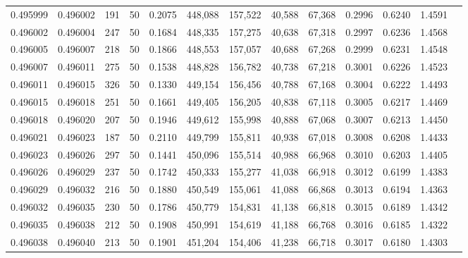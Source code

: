 \begin{tabular}{rrrrrrrrrrrrr}
0.495999 & 0.496002 &   191 &  50 &                                     0.2075 & 448,088 & 157,522 &  40,588 &  67,368 & 0.2996 & 0.6240 & 1.4591 \\
0.496002 & 0.496004 &   247 &  50 &                                     0.1684 & 448,335 & 157,275 &  40,638 &  67,318 & 0.2997 & 0.6236 & 1.4568 \\
0.496005 & 0.496007 &   218 &  50 &                                     0.1866 & 448,553 & 157,057 &  40,688 &  67,268 & 0.2999 & 0.6231 & 1.4548 \\
0.496007 & 0.496011 &   275 &  50 &                                     0.1538 & 448,828 & 156,782 &  40,738 &  67,218 & 0.3001 & 0.6226 & 1.4523 \\
0.496011 & 0.496015 &   326 &  50 &                                     0.1330 & 449,154 & 156,456 &  40,788 &  67,168 & 0.3004 & 0.6222 & 1.4493 \\
0.496015 & 0.496018 &   251 &  50 &                                     0.1661 & 449,405 & 156,205 &  40,838 &  67,118 & 0.3005 & 0.6217 & 1.4469 \\
0.496018 & 0.496020 &   207 &  50 &                                     0.1946 & 449,612 & 155,998 &  40,888 &  67,068 & 0.3007 & 0.6213 & 1.4450 \\
0.496021 & 0.496023 &   187 &  50 &                                     0.2110 & 449,799 & 155,811 &  40,938 &  67,018 & 0.3008 & 0.6208 & 1.4433 \\
0.496023 & 0.496026 &   297 &  50 &                                     0.1441 & 450,096 & 155,514 &  40,988 &  66,968 & 0.3010 & 0.6203 & 1.4405 \\
0.496026 & 0.496029 &   237 &  50 &                                     0.1742 & 450,333 & 155,277 &  41,038 &  66,918 & 0.3012 & 0.6199 & 1.4383 \\
0.496029 & 0.496032 &   216 &  50 &                                     0.1880 & 450,549 & 155,061 &  41,088 &  66,868 & 0.3013 & 0.6194 & 1.4363 \\
0.496032 & 0.496035 &   230 &  50 &                                     0.1786 & 450,779 & 154,831 &  41,138 &  66,818 & 0.3015 & 0.6189 & 1.4342 \\
0.496035 & 0.496038 &   212 &  50 &                                     0.1908 & 450,991 & 154,619 &  41,188 &  66,768 & 0.3016 & 0.6185 & 1.4322 \\
0.496038 & 0.496040 &   213 &  50 &                                     0.1901 & 451,204 & 154,406 &  41,238 &  66,718 & 0.3017 & 0.6180 & 1.4303 \\

\end{tabular}
